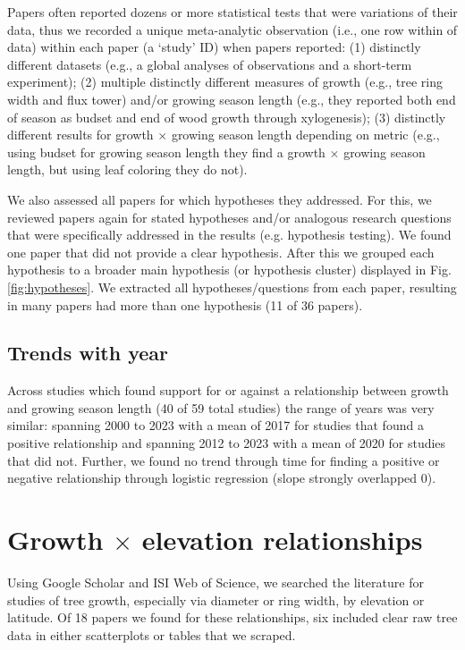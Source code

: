 \documentclass[11pt]{article}
\begin{document}
Papers often reported dozens or more statistical tests that were variations of their data, thus we recorded a unique meta-analytic observation (i.e., one row within of data) within each paper (a `study' ID) when papers reported: (1) distinctly different datasets (e.g., a global analyses of observations and a short-term experiment); (2) multiple distinctly different measures of growth (e.g., tree ring width and flux tower) and/or growing season length (e.g., they reported both end of season as budset and end of wood growth through xylogenesis); (3) distinctly different results for growth $\times$  growing season length depending on metric (e.g., using budset for growing season length they find a growth $\times$ growing season length, but using leaf coloring they do not). 

We also assessed all papers for which hypotheses they addressed. For this, we reviewed papers again for stated hypotheses and/or analogous research questions that were specifically addressed in the results (e.g. hypothesis testing).  We found one paper that did not provide a clear hypothesis. After this we grouped each hypothesis to a broader main hypothesis (or hypothesis cluster) displayed in Fig. \ref{fig:hypotheses}. We extracted all hypotheses/questions from each paper, resulting in many papers had more than one hypothesis (11 of 36 papers). %

\subsection*{Trends with year}
Across studies which found support for or against a relationship between growth and growing season length (40 of 59 total studies) the range of years was very similar: spanning 2000 to 2023 with a mean of 2017 for studies that found a positive relationship and spanning 2012 to 2023 with a mean of 2020 for studies that did not. Further, we found no trend through time for finding a positive or negative relationship through logistic regression (slope strongly overlapped 0). 

\section{Growth $\times$ elevation relationships}

Using Google Scholar and ISI Web of Science, we searched the literature for studies of tree growth, especially via diameter or ring width, by elevation or latitude. Of 18 papers we found for these relationships, six included clear raw tree data in either scatterplots or tables that we scraped. 
\end{document}
